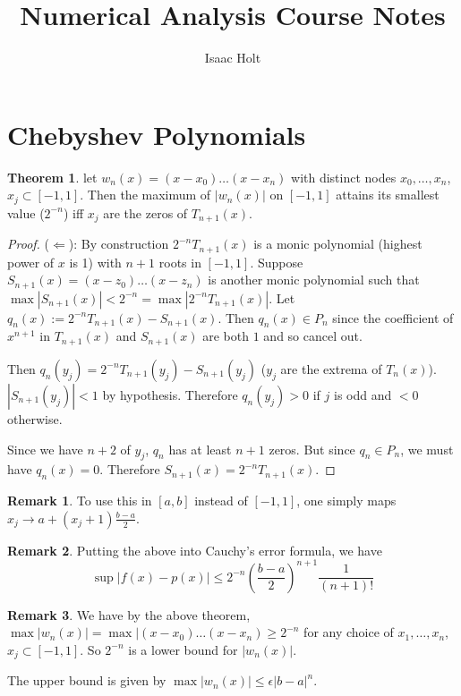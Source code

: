 \documentclass[12pt,a4paper]{article}
\title{Numerical Analysis Course Notes}
\author{Isaac Holt}
\theoremstyle{definition}
\newtheorem{theorem}[definition]{Theorem}
\newtheorem*{remark}{Remark}
\begin{document}
\maketitle

\section{Chebyshev Polynomials}

\begin{theorem}
let $w_n(x) = (x - x_0) \dots (x - x_n)$ with distinct nodes ${x_0, \dots, x_n}$, $x_j \subset [-1, 1]$. Then the maximum of $|w_n(x)|$ on $[-1, 1]$ attains its smallest value ($2^{-n}$) iff ${x_j}$ are the zeros of $T_{n + 1}(x)$.
\end{theorem}

\begin{proof}
	($\Longleftarrow$): By construction $2^{-n} T_{n+1}(x)$ is a monic polynomial (highest power of $x$ is 1) with $n + 1$ roots in $[-1, 1]$. Suppose $S_{n+1}(x) = (x - z_0)\dots(x - z_n)$ is another monic polynomial such that $\max |S_{n+1}(x)| < 2^{-n} = \max |2^{-n} T_{n+1}(x)|$. Let $q_n(x) := 2^{-n} T_{n+1}(x) - S_{n+1}(x)$. Then $q_n(x) \in P_n$ since the coefficient of $x^{n+1}$ in $T_{n+1}(x)$ and $S_{n+1}(x)$ are both $1$ and so cancel out.

	Then $q_n(y_j) = 2^{-n} T_{n+1}(y_j) - S_{n+1}(y_j)$ ($y_j$ are the extrema of $T_n(x)$). $|S_{n+1}(y_j)| < 1$ by hypothesis. Therefore $q_n(y_j) > 0$ if $j$ is odd and $< 0$ otherwise.

	Since we have $n+2$ of $y_j$, $q_n$ has at least $n+1$ zeros. But since $q_n \in P_n$, we must have $q_n(x)=0$. Therefore $S_{n+1}(x) = 2^{-n} T_{n+1}(x)$. 
\end{proof}

\begin{remark}
	To use this in $[a, b]$ instead of $[-1, 1]$, one simply maps $x_j \rightarrow a + (x_j + 1) \frac{b - a}{2}$.
\end{remark}

\begin{remark}
	Putting the above into Cauchy's error formula,
	we have \[\sup |f(x)-p(x)| \le 2^{-n} {(\frac{b - a}{2})}^{n + 1} \frac{1}{(n + 1)!}\]
\end{remark}

\begin{remark}
	We have by the above theorem, $\max |w_n(x)| = \max |(x - x_0)\dots(x - x_n) \ge 2^{-n}$ for any choice of ${x_1, \dots, x_n}$, $x_j \subset [-1, 1]$. So $2^{-n}$ is a lower bound for $|w_n(x)|$.

	The upper bound is given by $\max |w_n(x)| \le \epsilon |b-a|^n$. 
\end{remark}
\end{document}
